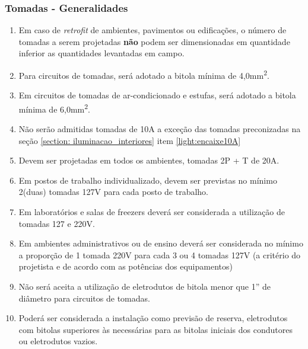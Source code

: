 \subsubsection{Tomadas - Generalidades}\label{section: socket-general}

\begin{enumerate}
		
	\item Em caso de \textit{retrofit} de ambientes, pavimentos ou edificações, o número de tomadas a serem projetadas \textbf{não} podem ser dimensionadas em quantidade inferior as quantidades levantadas em campo.
	
	\item \label{socket: bitola minima} Para circuitos de tomadas, será adotado a bitola mínima de 4,0mm\textsuperscript{2}.
	
	\item \label{socket: bitola minima ar} Em circuitos de tomadas de ar-condicionado e estufas, será adotado a bitola mínima de 6,0mm\textsuperscript{2}.
	
	\item Não serão admitidas tomadas de 10A a exceção das tomadas preconizadas na seção \ref*{section: iluminacao_interiores} item \ref*{light:encaixe10A}
	
	\item Devem ser projetadas em todos os ambientes, tomadas 2P + T de 20A.
	
	\item Em postos de trabalho individualizado, devem ser previstas no mínimo 2(duas) tomadas 127V para cada posto de trabalho.
	
	\item Em laboratórios e salas de freezers deverá ser considerada a utilização de tomadas 127 e 220V.
	
	\item Em ambientes administrativos ou de ensino deverá ser considerada no mínimo a proporção de 1 tomada 220V para cada 3 ou 4 tomadas 127V (a critério do projetista e de acordo com as potências dos equipamentos)
	
	\item Não será aceita a utilização de eletrodutos de bitola menor que 1” de diâmetro para circuitos de tomadas.
	
	\item Poderá ser considerada a instalação como previsão de reserva, eletrodutos com bitolas superiores às necessárias para as bitolas iniciais dos condutores ou eletrodutos vazios.
	

\end{enumerate}
